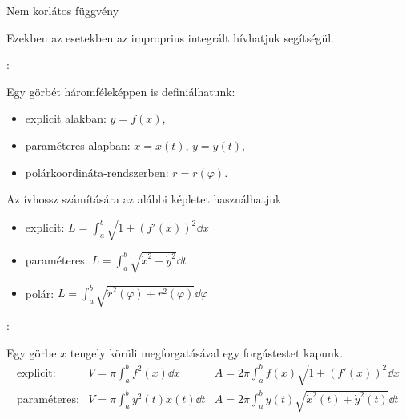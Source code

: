 \documentclass[a4paper, 12pt]{scrartcl}
\begin{document}
\begin{blueBox}
\begin{minipage}{.5\textwidth}

    Nem korlátos függvény
  \end{minipage}

  Ezekben az esetekben az improprius integrált hívhatjuk segítségül.
\end{blueBox}

\begin{blueBox}
  :

  Egy görbét háromféleképpen is definiálhatunk:
  \begin{itemize}
    \item explicit alakban: $y = f(x)$,
    \item paraméteres alapban: $x = x(t)$, $y = y(t)$,
    \item polárkoordináta-rendszerben: $r = r(\varphi)$.
  \end{itemize}

  Az ívhossz számítására az alábbi képletet használhatjuk:
  \begin{itemize}
    \item explicit: $\displaystyle
            L = \int_a^b \sqrt{1 + \left( f'(x) \right)^2} \dd x
          $

    \item paraméteres: $\displaystyle
            L = \int_a^b \sqrt{ \dot x^2 + \dot y^2} \dd t
          $

    \item polár: $\displaystyle
            L = \int_a^b \sqrt{ {\dot r}^2 (\varphi) + r^2(\varphi)} \dd \varphi
          $
  \end{itemize}
\end{blueBox}

\begin{blueBox}
  :

  Egy görbe $x$ tengely körüli megforgatásával egy forgástestet kapunk.
  \def\arraycolsep{12pt}
  \[
    \begin{array}{lll}
      \text{explicit:}    & \displaystyle V = \pi \int_a^b f^2(x) \dd x
                          & \displaystyle A = 2\pi \int_a^b f(x) \sqrt{1 + (f'(x))^2} \dd x
      \\[7mm]
      \text{paraméteres:} & \displaystyle V = \pi \int_a^b y^2(t) \dot x(t) \dd t
                          & \displaystyle A = 2\pi \int_a^b y(t) \sqrt{{\dot x}^2(t) + {\dot y}^2(t)} \dd t
    \end{array}
  \]
\end{blueBox}
\end{document}
